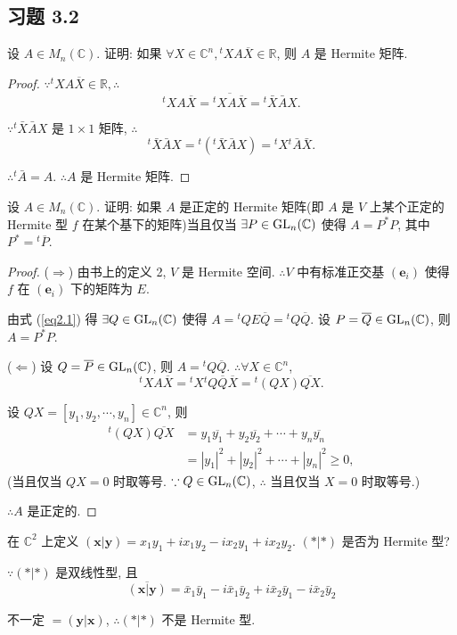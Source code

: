 \documentclass[color=black,device=normal,lang=cn,mode=geye]{elegantnote}
\begin{document}
\subsection{习题 3.2}
\begin{exercisec}%
    设 $A\in M_n(\mathbb{C})$. 证明: 如果 $\forall X\in\mathbb{C}^n,{}^tXA\overline{X}\in\mathbb{R}$, 则 $A$ 是 Hermite 矩阵.
\end{exercisec}
\begin{proof}
    $\because{}^tXA\overline{X}\in\mathbb{R},\therefore$
    \[{}^tXA\overline{X}=\overline{{}^tXA\overline{X}}={}^t\bar{X}\bar{A}X.\]

    $\because{}^t\bar{X}\bar{A}X$ 是 $1\times1$ 矩阵, $\therefore$
    \[{}^t\bar{X}\bar{A}X={}^t({}^t\bar{X}\bar{A}X)={}^tX{}^t\bar{A}\bar{X}.\]

    $\therefore{}^t\bar{A}=A$. $\therefore A$ 是 Hermite 矩阵.
\end{proof}
\begin{exercisec}%
    设 $A\in M_n(\mathbb{C})$. 证明: 如果 $A$ 是正定的 Hermite 矩阵(即 $A$ 是 $V$ 上某个正定的 Hermite 型 $f$ 在某个基下的矩阵)当且仅当 $\exists P\in\operatorname{GL} _n(\mathbb{C})$ 使得 $A=P^*P$, 其中 $P^*={}^t\overline{P}$.
\end{exercisec}
\begin{proof}
    ($\Rightarrow$) 由书上的定义 2, $V$ 是 Hermite 空间. $\therefore V$ 中有标准正交基 $(\boldsymbol{e}_i)$ 使得 $f$ 在 $(\boldsymbol{e}_i)$ 下的矩阵为 $E$.

    由式 (\ref{eq2.1}) 得 $\exists Q\in\operatorname{GL} _n(\mathbb{C})$ 使得 $A={}^tQE\overline{Q}={}^tQ\overline{Q}$. 设 $P=\overline{Q}\in\operatorname{GL} _n(\mathbb{C})$, 则 $A=P^*P$.

    ($\Leftarrow$) 设 $Q=\overline{P}\in\operatorname{GL} _n(\mathbb{C})$, 则 $A={}^tQ\overline{Q}$. $\therefore\forall X\in\mathbb{C}^n$,
    \[{}^tXA\overline{X}={}^tX{}^tQ\overline{Q}\overline{X}={}^t(QX)\overline{QX}.\]

    设 $QX=[y_1,y_2,\cdots,y_n]\in\mathbb{C}^n$, 则
    \begin{align*}
        {}^t(QX)\overline{QX} & =y_1\overline{y_1}+y_2\overline{y_2}+\cdots+y_n\overline{y_n} \\
        & =|y_1|^2+|y_2|^2+\cdots+|y_n|^2\geq0,
    \end{align*}
    (当且仅当 $QX=0$ 时取等号. $\because Q\in\operatorname{GL} _n(\mathbb{C})$, $\therefore$ 当且仅当 $X=0$ 时取等号.)

    $\therefore A$ 是正定的.
\end{proof}
\begin{exercisec}%
    在 $\mathbb{C}^2$ 上定义 $(\boldsymbol{x}|\boldsymbol{y})=x_1y_1+ix_1y_2-ix_2y_1+ix_2y_2$. $(*|*)$ 是否为 Hermite 型?
\end{exercisec}
\begin{solution}
    $\because(*|*)$ 是双线性型, 且
    \[\overline{(\boldsymbol{x}|\boldsymbol{y})}=\bar{x}_1\bar{y}_1-i\bar{x}_1\bar{y}_2+i\bar{x}_2\bar{y}_1-i\bar{x}_2\bar{y}_2\]

    不一定 $=(\boldsymbol{y}|\boldsymbol{x})$, $\therefore(*|*)$ 不是 Hermite 型.
\end{solution}
\end{document}

